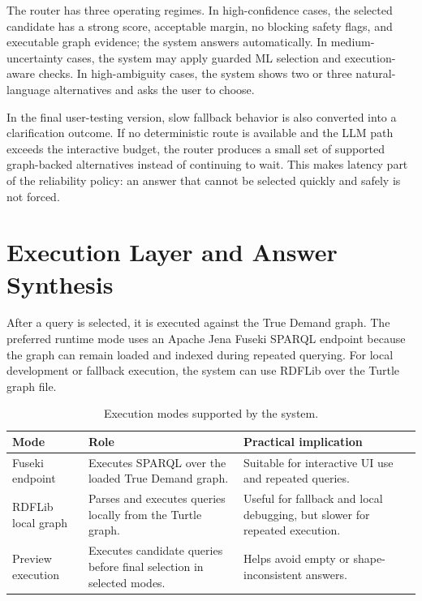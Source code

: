 \documentclass[
  12pt,
  english,
  oneside]{report}
\begin{document}
The router has three operating regimes. In high-confidence cases, the selected candidate has a strong score, acceptable margin, no blocking safety flags, and executable graph evidence; the system answers automatically. In medium-uncertainty cases, the system may apply guarded ML selection and execution-aware checks. In high-ambiguity cases, the system shows two or three natural-language alternatives and asks the user to choose.

In the final user-testing version, slow fallback behavior is also converted into a clarification outcome. If no deterministic route is available and the LLM path exceeds the interactive budget, the router produces a small set of supported graph-backed alternatives instead of continuing to wait. This makes latency part of the reliability policy: an answer that cannot be selected quickly and safely is not forced.

\section{Execution Layer and Answer Synthesis}
\label{sec:execution-answer-synthesis}

After a query is selected, it is executed against the True Demand graph. The preferred runtime mode uses an Apache Jena Fuseki SPARQL endpoint because the graph can remain loaded and indexed during repeated querying. For local development or fallback execution, the system can use RDFLib over the Turtle graph file.

\begin{table}[htbp]
\centering
\caption{Execution modes supported by the system.}
\label{tab:execution-modes}
\begin{tabularx}{\textwidth}{p{3.5cm} p{4cm} X}
\toprule
\textbf{Mode} & \textbf{Role} & \textbf{Practical implication} \\
\midrule
Fuseki endpoint & Executes SPARQL over the loaded True Demand graph. & Suitable for interactive UI use and repeated queries. \\
RDFLib local graph & Parses and executes queries locally from the Turtle graph. & Useful for fallback and local debugging, but slower for repeated execution. \\
Preview execution & Executes candidate queries before final selection in selected modes. & Helps avoid empty or shape-inconsistent answers. \\
\bottomrule
\end{tabularx}
\end{table}
\end{document}
